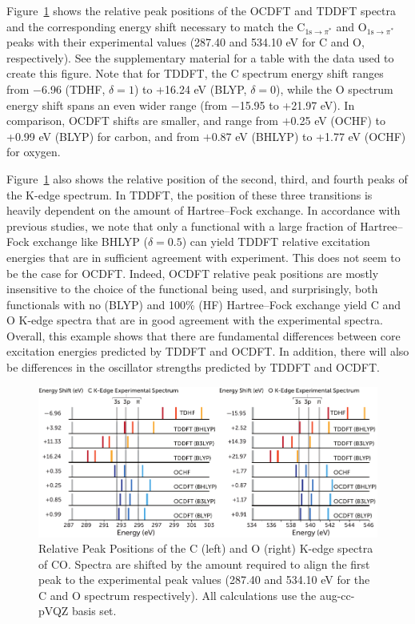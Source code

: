 \documentclass{article}
\begin{document}
Figure~\ref{fig: C1s} shows the relative peak positions of the OCDFT and TDDFT spectra and the corresponding energy shift necessary to match the C$_{1\text{s} \rightarrow \pi^*}$ and O$_{1\text{s} \rightarrow \pi^*}$ peaks with their experimental values (287.40 and 534.10 eV for C and O, respectively).  See the supplementary material for a table with the data used to create this figure.
Note that for TDDFT, the C spectrum energy shift ranges from $-$6.96 (TDHF, $\delta = 1$) to +16.24 eV (BLYP, $\delta = 0$), while the O spectrum energy shift spans an even wider range (from $-$15.95 to +21.97 eV).
In comparison, OCDFT shifts are smaller, and range from $+$0.25 eV (OCHF) to +0.99 eV (BLYP) for carbon, and from $+$0.87 eV (BHLYP) to +1.77 eV (OCHF) for oxygen.


Figure~\ref{fig: C1s} also shows the relative position of the second, third, and fourth peaks of the K-edge spectrum.
In TDDFT, the position of these three transitions is heavily dependent on the amount of Hartree--Fock exchange.
In accordance with previous studies,\cite{Besly-57p} we note that only a functional with a large fraction of Hartree--Fock exchange like BHLYP ($\delta = 0.5$) can yield TDDFT relative excitation energies that are in sufficient agreement with experiment.
This does not seem to be the case for OCDFT.  Indeed, OCDFT relative peak positions are mostly insensitive to the choice of the functional being used, and surprisingly, both functionals with no (BLYP) and 100\% (HF) Hartree--Fock exchange yield C and O K-edge spectra that are in good agreement with the experimental spectra.
Overall, this example shows that there are fundamental differences between core excitation energies predicted by TDDFT and OCDFT.
In addition, there will also be differences in the oscillator strengths predicted by TDDFT and OCDFT. 
\begin{figure}[h!]
	\includegraphics[width=6.5in]{figure_2.pdf}
	\caption{Relative Peak Positions of the C (left) and O (right) K-edge spectra of CO.
	Spectra are shifted by the amount required to align the first peak to the experimental peak values (287.40 and 534.10 eV for the C and O spectrum respectively).  All calculations use the aug-cc-pVQZ basis set.}
	\label{fig: C1s}
\end{figure}
\end{document}
